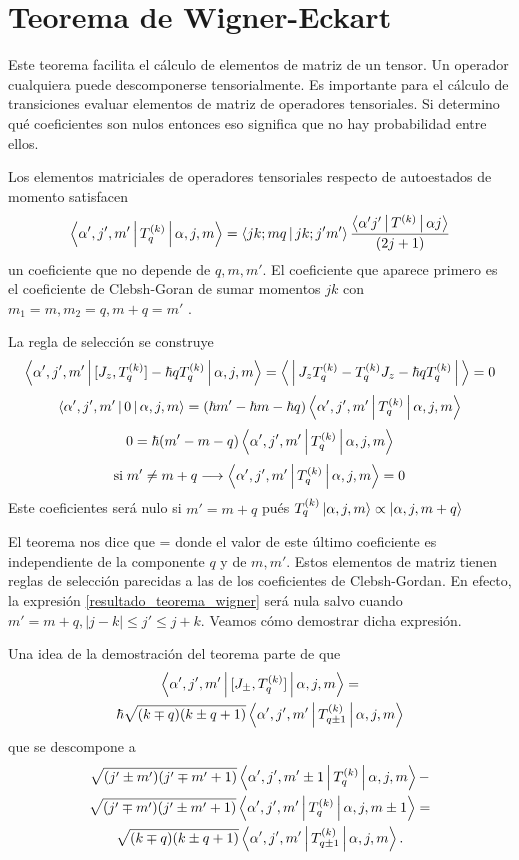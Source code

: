 \documentclass[10pt,oneside]{CBFT_book}
\begin{document}
\chapter{Teorema de Wigner-Eckart}

Este teorema facilita el cálculo de elementos de matriz de un tensor.
Un operador cualquiera puede descomponerse tensorialmente.
Es importante para el cálculo de transiciones evaluar elementos de matriz de operadores tensoriales.
Si determino qué coeficientes son nulos entonces eso significa que no hay probabilidad entre ellos.

Los elementos matriciales de operadores tensoriales respecto de autoestados de momento satisfacen 
\[
	\Braket{\alpha',j',m'|T^{(k)}_q|\alpha,j,m} =  \Braket{j k; m q | j k; j' m'}
	\frac{\Braket{\alpha' j'|T^{(k)}|\alpha j}}{(2j+1)}
\]
un coeficiente que no depende de $q,m,m'$. El coeficiente que aparece primero es el coeficiente de 
Clebsh-Goran de sumar momentos $jk$ con $m_1=m, m_2=q, m+q=m'$ .

La regla de selección se construye 
\[
	\Braket{\alpha',j',m'|[J_z, T^{(k)}_q] - \hbar q T^{(k)}_q |\alpha,j,m} = 
	\Braket{|J_z T^{(k)}_q - T^{(k)}_q J_z - \hbar q T^{(k)}_q|} = 0
\]
\[
	\Braket{\alpha',j',m'|0|\alpha,j,m} = 
	(\hbar m' - \hbar m -\hbar q )\Braket{\alpha',j',m'|T^{(k)}_q|\alpha,j,m}
\]
\[
	0 = \hbar ( m' - m - q ) \Braket{\alpha',j',m'|T^{(k)}_q|\alpha,j,m}
\]
\[
	\text{si} \; m' \neq m+q \longrightarrow \Braket{\alpha',j',m'|T^{(k)}_q|\alpha,j,m} = 0
\]
Este coeficientes será nulo si $m' = m+q$ pués $T_q^{(k)}\Ket{\alpha,j,m} \propto \Ket{\alpha,j,m+q}$

El teorema nos dice que
\be
	 =  
	\label{resultado_teorema_wigner}
\ee
donde el valor de este último coeficiente es independiente de la componente $q$ y de $m, m'$.
Estos elementos de matriz tienen reglas de selección parecidas a las de los coeficientes de
Clebsh-Gordan.
En efecto, la expresión \eqref{resultado_teorema_wigner} será nula salvo cuando $m'= m+q, 
|j-k| \leq j' \leq j + k$. Veamos cómo demostrar dicha expresión.

Una idea de la demostración del teorema parte de que 
\begin{multline*}
	\Braket{\alpha',j',m'|[J_\pm ,T^{(k)}_q]|\alpha,j,m} = \\
	\hbar\sqrt{(k\mp q)(k\pm q + 1)} 
	\Braket{\alpha',j',m'|T^{(k)}_{q\pm 1}|\alpha,j,m} 
\end{multline*}
que se descompone a 
\begin{multline*}
	\sqrt{(j'\pm m')(j'\mp m' + 1)} \Braket{\alpha',j',m'\pm 1|T^{(k)}_q|\alpha,j,m} - \\
	\sqrt{(j'\mp m')(j'\pm m' + 1)} \Braket{\alpha',j',m'|T^{(k)}_q|\alpha,j,m \pm 1} = \\
	\sqrt{(k\mp q)(k\pm q + 1)}  \Braket{\alpha',j',m'|T^{(k)}_{q\pm 1}|\alpha,j,m}.
\end{multline*}
\end{document}
